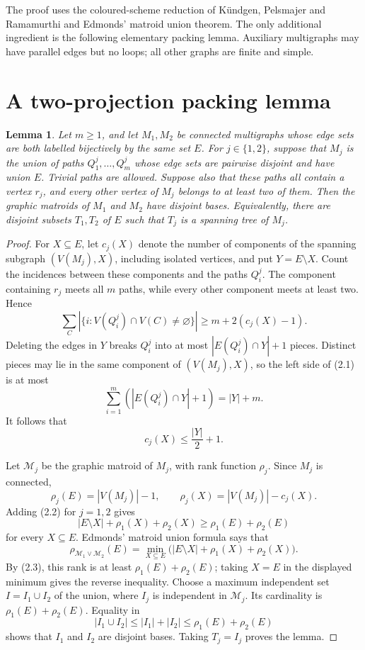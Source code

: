\documentclass[11pt]{amsart}
\newtheorem{lemma}[theorem]{Lemma}
\begin{document}
The proof uses the coloured-scheme reduction of K\"undgen, Pelsmajer and
Ramamurthi and Edmonds' matroid union theorem.  The only additional
ingredient is the following elementary packing lemma.  Auxiliary
multigraphs may have parallel edges but no loops; all other graphs are
finite and simple.

\section{A two-projection packing lemma}

\begin{lemma}\label{lem:packing}
Let $m\geq1$, and let $M_1,M_2$ be connected multigraphs whose edge sets
are both labelled bijectively by the same set $E$.  For
$j\in\{1,2\}$, suppose that $M_j$ is the union of paths
$Q_1^j,\ldots,Q_m^j$ whose edge sets are pairwise disjoint and have union
$E$.  Trivial paths are allowed.  Suppose also that these paths all
contain a vertex $r_j$, and every other vertex of $M_j$ belongs to at
least two of them.  Then the graphic matroids of $M_1$ and $M_2$ have
disjoint bases.  Equivalently, there are disjoint subsets $T_1,T_2$ of
$E$ such that $T_j$ is a spanning tree of $M_j$.
\end{lemma}

\begin{proof}
For $X\subseteq E$, let $c_j(X)$ denote the number of components of the
spanning subgraph $(V(M_j),X)$, including isolated vertices, and put
$Y=E\setminus X$.  Count the incidences between these components and the
paths $Q_i^j$.  The component containing $r_j$ meets all $m$ paths, while
every other component meets at least two.  Hence
\[
        \sum_C |\{i:V(Q_i^j)\cap V(C)\ne\varnothing\}|
             \geq m+2(c_j(X)-1).                         \tag{2.1}
\]
Deleting the edges in $Y$ breaks $Q_i^j$ into at most
$|E(Q_i^j)\cap Y|+1$ pieces.  Distinct pieces may lie in the same
component of $(V(M_j),X)$, so the left side of (2.1) is at most
\[
             \sum_{i=1}^m (|E(Q_i^j)\cap Y|+1)=|Y|+m.
\]
It follows that
\[
                    c_j(X)\leq \frac{|Y|}{2}+1.           \tag{2.2}
\]

Let $\mathcal M_j$ be the graphic matroid of $M_j$, with rank function
$\rho_j$.  Since $M_j$ is connected,
\[
 \rho_j(E)=|V(M_j)|-1,
 \qquad
 \rho_j(X)=|V(M_j)|-c_j(X).
\]
Adding (2.2) for $j=1,2$ gives
\[
 |E\setminus X|+\rho_1(X)+\rho_2(X)
       \geq \rho_1(E)+\rho_2(E)                         \tag{2.3}
\]
for every $X\subseteq E$.  Edmonds' matroid union formula
\cite{Edmonds1970} says that
\[
 \rho_{\mathcal M_1\vee\mathcal M_2}(E)
   =\min_{X\subseteq E}
      \bigl(|E\setminus X|+\rho_1(X)+\rho_2(X)\bigr).
\]
By (2.3), this rank is at least $\rho_1(E)+\rho_2(E)$; taking $X=E$ in
the displayed minimum gives the reverse inequality.  Choose a maximum
independent set $I=I_1\cup I_2$ of the union, where $I_j$ is independent
in $\mathcal M_j$.  Its cardinality is $\rho_1(E)+\rho_2(E)$.  Equality in
\[
 |I_1\cup I_2|\leq |I_1|+|I_2|
                  \leq \rho_1(E)+\rho_2(E)
\]
shows that $I_1$ and $I_2$ are disjoint bases.  Taking $T_j=I_j$ proves
the lemma.
\end{proof}
\end{document}
